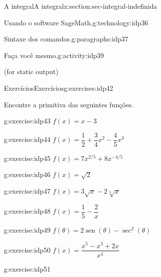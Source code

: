 \documentclass[oneside,10pt,]{article}
\numberwithin{equation}{section}
\DeclareMathOperator{\sin}{sen}
\begin{document}
\begin{sectionptx}{A integral}{}{A integral}{}{}{x:section:sec-integral-indefinida}
\begin{technology}{Usando o software SageMath.}{g:technology:idp36}
\begin{paragraphs}{Sintaxe dos comandos.}{g:paragraphs:idp37}
\begin{activity}{Faça você mesmo.}{g:activity:idp39}
\begin{sageinput}
\end{sageinput}
\begin{sageoutput}
(for static output)
\end{sageoutput}
%
\end{activity}%
\end{paragraphs}%
\end{technology}
%
%
%
%
\typeout{************************************************}
\typeout{************************************************}
%
\begin{exercises-subsection}{Exercícios}{}{Exercícios}{}{}{g:exercises:idp42}
\par\medskip\noindent%
%
Encontre a primitiva das seguintes funções.%
\begin{exercisegroupcol}{2}
\begin{divisionexerciseegcol}{1}{}{}{g:exercise:idp43}%
\(f(x) = x - 3\)\end{divisionexerciseegcol}%
\begin{divisionexerciseegcol}{2}{}{}{g:exercise:idp44}%
\(f(x) = \dfrac{1}{2} + \dfrac{3}{4}x^2 - \dfrac{4}{5}x^3\)\end{divisionexerciseegcol}%
\begin{divisionexerciseegcol}{3}{}{}{g:exercise:idp45}%
\(f(x) = 7x^{2/5} + 8 x^{-4/5}\)\end{divisionexerciseegcol}%
\begin{divisionexerciseegcol}{4}{}{}{g:exercise:idp46}%
\(f(x) = \sqrt{2}\)\end{divisionexerciseegcol}%
\begin{divisionexerciseegcol}{5}{}{}{g:exercise:idp47}%
\(f(x) = 3 \sqrt{x} - 2\sqrt[3]{x} \)\end{divisionexerciseegcol}%
\begin{divisionexerciseegcol}{6}{}{}{g:exercise:idp48}%
\(f(x) = \dfrac{1}{5} - \dfrac{2}{x}\)\end{divisionexerciseegcol}%
\begin{divisionexerciseegcol}{7}{}{}{g:exercise:idp49}%
\(f(\theta) = 2 \sin (\theta) - \sec^2(\theta)\)\end{divisionexerciseegcol}%
\begin{divisionexerciseegcol}{8}{}{}{g:exercise:idp50}%
\(f(x) = \dfrac{x^5 - x^3 + 2x}{x^4}\)\end{divisionexerciseegcol}%
\begin{divisionexerciseegcol}{9}{}{}{g:exercise:idp51}%

\end{divisionexerciseegcol}
\end{exercisegroupcol}
\end{exercises-subsection}
\end{sectionptx}
\end{document}
